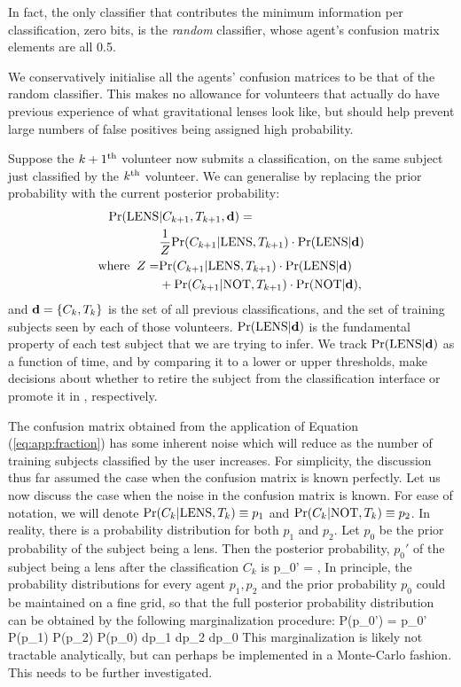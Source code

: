 \documentclass[useAMS,usenatbib,a4paper]{mn2e}
\begin{document}
In fact, the only classifier that contributes the minimum information per
classification, zero bits, is the {\it random} classifier, whose agent's
confusion matrix elements are all 0.5.   

We conservatively initialise all the agents' confusion matrices to be that of
the random classifier. This makes no allowance for volunteers that actually do
have previous experience of what gravitational lenses look like, but should
help prevent large numbers of false positives being assigned high probability.

Suppose the $k+1^{\rm th}$ volunteer now submits a classification, on the same
subject just classified by the $k^{\rm th}$ volunteer. We can generalise
 by replacing the prior probability with the current
posterior probability:
\begin{align}
  \label{eq:app:update}
  {\rm Pr}({\rm LENS} & |C_{k+1},T_{k+1},{\mathbf{d}}) = \\
  & \frac{1}{Z} {\rm Pr}(C_{k+1}|{\rm LENS},T_{k+1}) \cdot {\rm Pr}({\rm LENS}|{\mathbf{d}}) \\ \notag
{\rm where}\;\; Z = & {\rm Pr}(C_{k+1}|{\rm LENS},T_{k+1})\cdot{\rm Pr}({\rm LENS}|{\mathbf{d}}) \\ \notag
      & + {\rm Pr}(C_{k+1}|{\rm NOT},T_{k+1})\cdot{\rm Pr}({\rm NOT}|{\mathbf{d}}), \notag
\end{align}
and ${\mathbf{d}} = \{C_k,T_k\}$ is the set of all previous
classifications, and the set of training subjects seen by each of those
volunteers.
${\rm Pr}({\rm LENS}|{\mathbf{d}})$ is the fundamental property of each test subject that
we are trying to infer. We track ${\rm Pr}({\rm LENS}|{\mathbf{d}})$ as a function of time,
and by comparing it to a lower or upper thresholds, make decisions about
whether to retire the subject from the classification interface or
promote it in \Talk, respectively.

The confusion matrix obtained from the application of Equation
(\ref{eq:app:fraction}) has some inherent noise which will reduce as the number
of training subjects classified by the user increases. For simplicity, the
discussion thus far assumed the case when the confusion matrix is known
perfectly. Let us now discuss the case when the noise in the confusion matrix
is known. For ease of notation, we will denote ${\rm Pr}(C_k|{\rm LENS},T_k)\equiv p_1$
and ${\rm Pr}(C_k|{\rm NOT},T_k)\equiv p_2$. In reality, there is a probability
distribution for both $p_1$ and $p_2$. Let $p_0$ be the prior probability of
the subject being a lens. Then the posterior probability, $p_0'$ of the subject
being a lens after the classification $C_k$ is
\be
  \label{eq:app:sec}
p_0' = ,
\ee
In principle, the probability distributions for every agent $p_1,p_2$ and the
prior probability $p_0$ could be maintained on a fine grid, so that the full
posterior probability distribution can be obtained by the following
marginalization procedure:
\be
P(p_0') = \int p_0' P(p_1) P(p_2) P(p_0) dp_1 dp_2 dp_0
\ee
This marginalization is likely not tractable analytically, but can perhaps be
implemented in a Monte-Carlo fashion. This needs to be further investigated.
\end{document}
